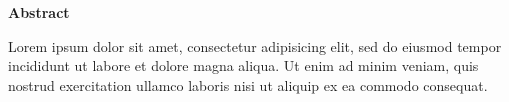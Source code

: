 
\clearpage
\begin{adjustwidth}{0.1\textwidth}{0.1\textwidth}
\begingroup
\null\vspace{0.2\textheight}
\begin{center}
{\bfseries\Large Abstract}\par\vspace{2em}

Lorem ipsum dolor sit amet, consectetur adipisicing elit, sed do eiusmod tempor incididunt ut labore et dolore magna aliqua. Ut enim ad minim veniam, quis nostrud exercitation ullamco laboris nisi ut aliquip ex ea commodo consequat.
\end{center}
\endgroup
\end{adjustwidth}
\clearpage